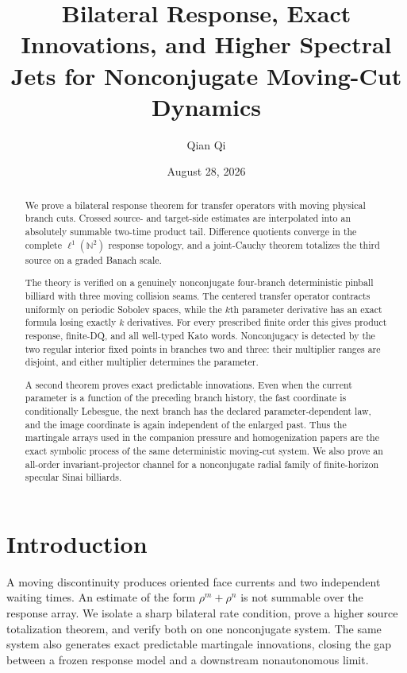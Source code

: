 \documentclass[11pt,reqno]{amsart}
\title[Bilateral response and exact innovations]{Bilateral Response, Exact Innovations, and Higher Spectral Jets for Nonconjugate Moving-Cut Dynamics}
\author{Qian Qi}
\date{August 28, 2026}
\theoremstyle{definition}
\theoremstyle{remark}
\newcommand{\N}{\mathbb N}
\begin{document}
\begin{abstract}
We prove a bilateral response theorem for transfer operators with moving
physical branch cuts.  Crossed source- and target-side estimates are
interpolated into an absolutely summable two-time product tail.  Difference
quotients converge in the complete $\ell^1(\N^2)$ response topology, and a
joint-Cauchy theorem totalizes the third source on a graded Banach scale.

The theory is verified on a genuinely nonconjugate four-branch deterministic
pinball billiard with three moving collision seams.  The centered transfer
operator contracts uniformly on periodic Sobolev spaces, while the $k$th
parameter derivative has an exact formula losing exactly $k$ derivatives.
For every prescribed finite order this gives product response, finite-DQ, and
all well-typed Kato words.  Nonconjugacy is detected by the two regular
interior fixed points in branches two and three: their multiplier ranges are
disjoint, and either multiplier determines the parameter.

A second theorem proves exact predictable innovations.  Even when the current
parameter is a function of the preceding branch history, the fast coordinate
is conditionally Lebesgue, the next branch has the declared
parameter-dependent law, and the image coordinate is again independent of the
enlarged past.  Thus the martingale arrays used in the companion pressure and
homogenization papers are the exact symbolic process of the same deterministic
moving-cut system.  We also prove an all-order invariant-projector channel for
a nonconjugate radial family of finite-horizon specular Sinai billiards.
\end{abstract}
\maketitle
\tableofcontents

\section{Introduction}
A moving discontinuity produces oriented face currents and two independent
waiting times.  An estimate of the form $\rho^m+\rho^n$ is not summable over the
response array.  We isolate a sharp bilateral rate condition, prove a higher
source totalization theorem, and verify both on one nonconjugate system.  The
same system also generates exact predictable martingale innovations, closing
the gap between a frozen response model and a downstream nonautonomous limit.
\end{document}
